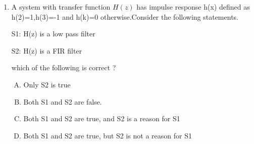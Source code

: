 \documentclass[journal,12pt,twocolumn]{IEEEtran}
\begin{document}
\begin{enumerate}
\begin{enumerate}[(A)]
\end{enumerate}

\item A system with transfer function $H(z)$ has impulse response h(x) defined as h(2)=1,h(3)=-1 and h(k)=0 otherwise.Consider the following statements.
     \begin{center}
     S1: H(z) is a low pass filter\end{center} \begin{center}
     
    S2: H(z) is a FIR filter \end{center} 
     
which of the following is correct ?

\begin{enumerate}[(A)]

\setlength\itemsep{1em}

\item Only S2 is true
\item Both S1 and S2 are false.
\item Both S1 and S2 are true, and S2 is a reason for S1
\item Both S1 and S2 are true, but S2 is not a reason for S1

\end{enumerate}

%
%
%
%
%


\end{enumerate}
\end{document}
